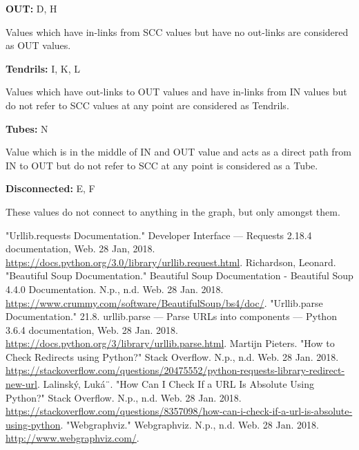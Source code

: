 \documentclass[letterpaper,12pt]{article}
\begin{document}
\textbf{OUT:} D, H

Values which have in-links from SCC values but have no out-links are considered as OUT values.

\textbf{Tendrils:} I, K, L

Values which have out-links to OUT values and have in-links from IN values but do not refer to SCC values at any point are considered as Tendrils. 

\textbf{Tubes:} N

Value which is in the middle of IN and OUT value and acts as a direct path from IN to OUT but do not refer to SCC at any point is considered as a Tube.

\textbf{Disconnected:} E, F

These values do not connect to anything in the graph, but only amongst them.

\clearpage


\clearpage


\begin{thebibliography}{9}
"Urllib.requests Documentation." Developer Interface — Requests 2.18.4 documentation, Web. 28 Jan, 2018. \url{https://docs.python.org/3.0/library/urllib.request.html}. 
Richardson, Leonard. "Beautiful Soup Documentation." Beautiful Soup Documentation - Beautiful Soup 4.4.0 Documentation. N.p., n.d. Web. 28 Jan. 2018. \url{https://www.crummy.com/software/BeautifulSoup/bs4/doc/}.
"Urllib.parse Documentation." 21.8. urllib.parse — Parse URLs into components — Python 3.6.4 documentation, Web. 28 Jan. 2018. \url{https://docs.python.org/3/library/urllib.parse.html}.
Martijn Pieters. "How to Check Redirects using Python?" Stack Overflow. N.p., n.d. Web. 28 Jan. 2018. \url{https://stackoverflow.com/questions/20475552/python-requests-library-redirect-new-url}.
Lalinský, Luká¨. "How Can I Check If a URL Is Absolute Using Python?" Stack Overflow. N.p., n.d. Web. 28 Jan. 2018. \url{https://stackoverflow.com/questions/8357098/how-can-i-check-if-a-url-is-absolute-using-python}.
"Webgraphviz." Webgraphviz. N.p., n.d. Web. 28 Jan. 2018. \url{http://www.webgraphviz.com/}.
\end{thebibliography}
\end{document}
